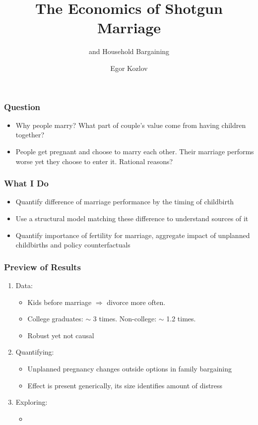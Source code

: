 \documentclass{beamer}
\title{The Economics of Shotgun Marriage}
\subtitle{and Household Bargaining}
\author{Egor Kozlov}
\institute{
  Department of Economics\\
  Northwestern University}
\begin{document}
\begin{frame}[plain]
\addtocounter{framenumber}{-1}
\date{\scriptsize}
\titlepage
\end{frame}


\begin{frame}[plain]
\frametitle{Question}
\begin{itemize}

\item Why people marry? What part of couple's value come from having children together?

\item People get pregnant and choose to marry each other. Their marriage performs worse yet they choose to enter it. Rational reasons?

\end{itemize}
\end{frame}


\begin{frame}[plain]
\frametitle{What I Do}
\begin{itemize}

\item Quantify difference of marriage performance by the timing of childbirth

\item Use a structural model matching these difference to understand sources of it

\item Quantify importance of fertility for marriage, aggregate impact of unplanned childbirths and policy counterfactuals

\end{itemize}
\end{frame}

\begin{frame}[plain]
\frametitle{Preview of Results}

\begin{enumerate}

\item Data: 
\begin{itemize}
\item Kids before marriage $\Rightarrow$ divorce more often.
\item College graduates: $\sim$ 3 times. Non-college: $\sim$ 1.2 times.
\item Robust yet not causal
\end{itemize}

\item Quantifying:
\begin{itemize}
\item Unplanned pregnancy changes outside options in family bargaining
\item Effect is present generically, its size identifies amount of distress
\end{itemize}

\item Exploring:
\begin{itemize}
\item 
\end{itemize}

\end{enumerate}
\end{frame}
\end{document}
